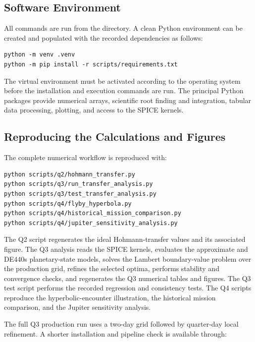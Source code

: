 \documentclass[11pt,a4paper]{article}
\begin{document}
\subsection{Software Environment}

All commands are run from the  directory. A clean Python
environment can be created and populated with the recorded dependencies as
follows:

\begin{lstlisting}[basicstyle=\ttfamily\small]
python -m venv .venv
python -m pip install -r scripts/requirements.txt
\end{lstlisting}

The virtual environment must be activated according to the operating system
before the installation and execution commands are run. The principal Python
packages provide numerical arrays, scientific root finding and integration,
tabular data processing, plotting, and access to the SPICE kernels.

\subsection{Reproducing the Calculations and Figures}

The complete numerical workflow is reproduced with:

\begin{lstlisting}[basicstyle=\ttfamily\small]
python scripts/q2/hohmann_transfer.py
python scripts/q3/run_transfer_analysis.py
python scripts/q3/test_transfer_analysis.py
python scripts/q4/flyby_hyperbola.py
python scripts/q4/historical_mission_comparison.py
python scripts/q4/jupiter_sensitivity_analysis.py
\end{lstlisting}

The Q2 script regenerates the ideal Hohmann-transfer values and its associated
figure. The Q3 analysis reads the SPICE kernels, evaluates the approximate and
DE440s planetary-state models, solves the Lambert boundary-value problem over
the production grid, refines the selected optima, performs stability and
convergence checks, and regenerates the Q3 numerical tables and figures. The Q3
test script performs the recorded regression and consistency tests. The Q4
scripts reproduce the hyperbolic-encounter illustration, the historical
mission comparison, and the Jupiter sensitivity analysis.

The full Q3 production run uses a two-day grid followed by quarter-day local
refinement. A shorter installation and pipeline check is available through:
\end{document}

